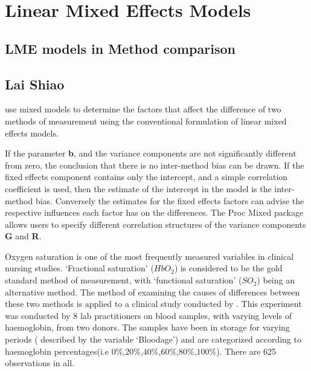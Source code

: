 \documentclass[12pt, a4paper]{report}
\begin{document}

\newpage



\chapter{Linear Mixed Effects Models}

\section{LME models in Method comparison}








\newpage
\section{Lai Shiao}
\citet{LaiShiao} use mixed models to determine the factors that
affect the difference of two methods of measurement using the
conventional formulation of linear mixed effects models.

If the parameter \textbf{b}, and the variance components are not
significantly different from zero, the conclusion that there is no
inter-method bias can be drawn. If the fixed effects component
contains only the intercept, and a simple correlation coefficient
is used, then the estimate of the intercept in the model is the
inter-method bias. Conversely the estimates for the fixed effects
factors can advise the respective influences each factor has on
the differences. The Proc Mixed package allows users to specify
different correlation structures of the variance components
\textbf{G} and \textbf{R}.


Oxygen saturation is one of the most frequently measured variables
in clinical nursing studies. `Fractional saturation' ($HbO_{2}$)
is considered to be the gold standard method of measurement, with
`functional saturation' ($SO_{2}$) being an alternative method.
The method of examining the causes of differences between these
two methods is applied to a clinical study conducted by
\citet{Shiao}. This experiment was conducted by 8 lab
practitioners on blood samples, with varying levels of
haemoglobin, from two donors. The samples have been in storage for
varying periods ( described by the variable `Bloodage') and are
categorized according to haemoglobin percentages(i.e
$0\%$,$20\%$,$40\%$,$60\%$,$80\%$,$100\%$). There are 625
observations in all.
\end{document}
